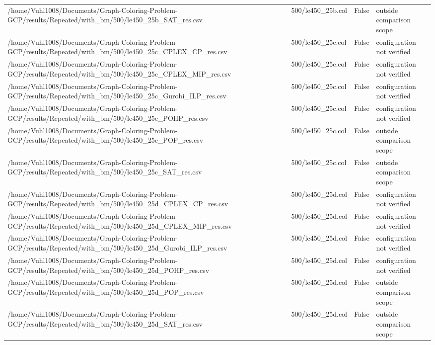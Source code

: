 \begin{table}[htbp]
\begin{tabular}{llll}
/home/Vuhl1008/Documents/Graph-Coloring-Problem-GCP/results/Repeated/with\_bm/500/le450\_25b\_SAT\_res.csv & 500/le450\_25b.col & False & outside comparison scope \\
/home/Vuhl1008/Documents/Graph-Coloring-Problem-GCP/results/Repeated/with\_bm/500/le450\_25c\_CPLEX\_CP\_res.csv & 500/le450\_25c.col & False & configuration not verified \\
/home/Vuhl1008/Documents/Graph-Coloring-Problem-GCP/results/Repeated/with\_bm/500/le450\_25c\_CPLEX\_MIP\_res.csv & 500/le450\_25c.col & False & configuration not verified \\
/home/Vuhl1008/Documents/Graph-Coloring-Problem-GCP/results/Repeated/with\_bm/500/le450\_25c\_Gurobi\_ILP\_res.csv & 500/le450\_25c.col & False & configuration not verified \\
/home/Vuhl1008/Documents/Graph-Coloring-Problem-GCP/results/Repeated/with\_bm/500/le450\_25c\_POHP\_res.csv & 500/le450\_25c.col & False & configuration not verified \\
/home/Vuhl1008/Documents/Graph-Coloring-Problem-GCP/results/Repeated/with\_bm/500/le450\_25c\_POP\_res.csv & 500/le450\_25c.col & False & outside comparison scope \\
/home/Vuhl1008/Documents/Graph-Coloring-Problem-GCP/results/Repeated/with\_bm/500/le450\_25c\_SAT\_res.csv & 500/le450\_25c.col & False & outside comparison scope \\
/home/Vuhl1008/Documents/Graph-Coloring-Problem-GCP/results/Repeated/with\_bm/500/le450\_25d\_CPLEX\_CP\_res.csv & 500/le450\_25d.col & False & configuration not verified \\
/home/Vuhl1008/Documents/Graph-Coloring-Problem-GCP/results/Repeated/with\_bm/500/le450\_25d\_CPLEX\_MIP\_res.csv & 500/le450\_25d.col & False & configuration not verified \\
/home/Vuhl1008/Documents/Graph-Coloring-Problem-GCP/results/Repeated/with\_bm/500/le450\_25d\_Gurobi\_ILP\_res.csv & 500/le450\_25d.col & False & configuration not verified \\
/home/Vuhl1008/Documents/Graph-Coloring-Problem-GCP/results/Repeated/with\_bm/500/le450\_25d\_POHP\_res.csv & 500/le450\_25d.col & False & configuration not verified \\
/home/Vuhl1008/Documents/Graph-Coloring-Problem-GCP/results/Repeated/with\_bm/500/le450\_25d\_POP\_res.csv & 500/le450\_25d.col & False & outside comparison scope \\
/home/Vuhl1008/Documents/Graph-Coloring-Problem-GCP/results/Repeated/with\_bm/500/le450\_25d\_SAT\_res.csv & 500/le450\_25d.col & False & outside comparison scope \\

\end{tabular}
\end{table}
